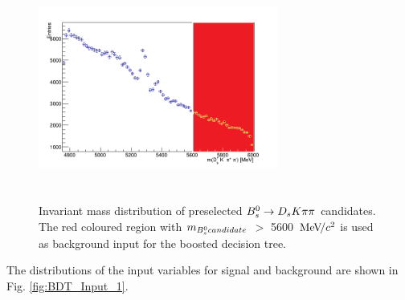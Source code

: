 \begin{figure}[h]
\includegraphics[height=7.4cm,width=0.7\textwidth]{figs/mass_Bs_forBDT_12_AnA.png}
\caption{Invariant mass distribution of preselected ${{B}^0_{s}}\rightarrow{\ensuremath{{D}_{s}}}{\ensuremath{K}}{\ensuremath{\pi}}{\ensuremath{\pi}}$ candidates. The red coloured region with $m_{{{B}^0_{s}} candidate}$ $>$ 5600 ${\mathrm{\,Me\kern -0.1em V\!/}c^2}$ is used as background input for the boosted decision tree.}
\label{fig:massforBDT}
\end{figure}

The distributions of the input variables for signal and background are shown in Fig. \ref{fig:BDT_Input_1}. 

